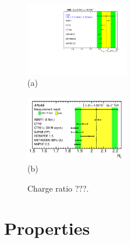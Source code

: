 \documentclass{PoS}
\begin{document}
\begin{figure}[htbp]
\begin{center}
\parbox[t]{0.45\textwidth}{\centering\includegraphics[width=0.4\textwidth]{cms_xsec8/charge.pdf}\\(a)}
\parbox[t]{0.45\textwidth}{\centering\includegraphics[width=0.4\textwidth]{atlas_charge7/charge.pdf}\\(b)}
\end{center}
\caption{\label{fig:charge-ratio}Charge ratio ???.}

\end{figure}



\section{Properties}
\end{document}
